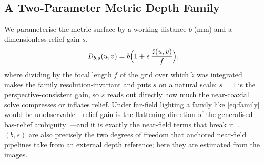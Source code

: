 \documentclass[conference]{IEEEtran}
\newcommand{\zt}{\tilde z}
\begin{document}
\subsection{A Two-Parameter Metric Depth Family}\label{sub:family}
We parameterise the metric surface by a working distance $b$ (mm) and a
dimensionless relief gain $s$,
\begin{equation}
D_{b,s}(u,v)=b\Bigl(1+s\,\frac{\zt(u,v)}{f}\Bigr),
\label{eq:family}
\end{equation}
where dividing by the focal length $f$ of the grid over which $\zt$ was
integrated makes the family resolution-invariant and puts $s$ on a
natural scale: $s=1$ is the perspective-consistent gain, so $s$ reads out
directly how much the near-coaxial solve compresses or inflates relief.
Under far-field lighting a family like \eqref{eq:family} would be
unobservable---relief gain is the flattening direction of the generalised
bas-relief ambiguity~\cite{belhumeur1999basrelief}---and it is exactly
the near-field terms that break it~\cite{papadhimitri2014uncalibrated}.
$(b,s)$ are also precisely the two degrees of freedom that anchored
near-field pipelines take from an external depth reference; here they are
estimated from the images.
\end{document}
